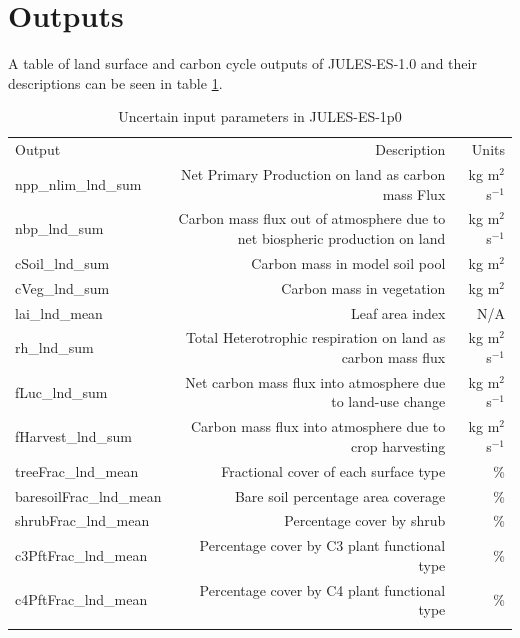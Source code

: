 \documentclass[gmd, manuscript]{copernicus}
\begin{document}
\section{Outputs}\label{app:Outputs}
A table of land surface and carbon cycle outputs of JULES-ES-1.0 and their descriptions can be seen in table \ref{table:outputs}.
\begin{table}[ht]
\caption{Uncertain input parameters in JULES-ES-1p0}
\label{table:outputs}
\begin{tabular}{l r r}
\tophline
Output & Description & Units \\ 
\middlehline

npp\_nlim\_lnd\_sum & Net Primary Production on land as carbon mass Flux & kg m$^{2}$ s$^{-1}$ \\ 

nbp\_lnd\_sum & Carbon mass flux out of atmosphere due to net biospheric production on land & kg m$^{2}$ s$^{-1}$ \\

cSoil\_lnd\_sum & Carbon mass in model soil pool & kg m$^{2}$ \\

cVeg\_lnd\_sum & Carbon mass in vegetation &  kg m$^{2}$  \\

lai\_lnd\_mean & Leaf area index & N/A \\

rh\_lnd\_sum & Total Heterotrophic respiration on land as carbon mass flux & kg m$^{2}$ s$^{-1}$ \\

fLuc\_lnd\_sum & Net carbon mass flux into atmosphere due to land-use change & kg m$^{2}$ s$^{-1}$\\

fHarvest\_lnd\_sum & Carbon mass flux into atmosphere due to crop harvesting &  kg m$^{2}$ s$^{-1}$\\

treeFrac\_lnd\_mean & Fractional cover of each surface type & \% \\

baresoilFrac\_lnd\_mean & Bare soil percentage area coverage & \% \\

shrubFrac\_lnd\_mean & Percentage cover by shrub &  \% \\

c3PftFrac\_lnd\_mean & Percentage cover by C3 plant functional type & \% \\

c4PftFrac\_lnd\_mean & Percentage cover by C4 plant functional type & \% \\


\bottomhline
\end{tabular}
\belowtable{} %

\end{table}
\end{document}
